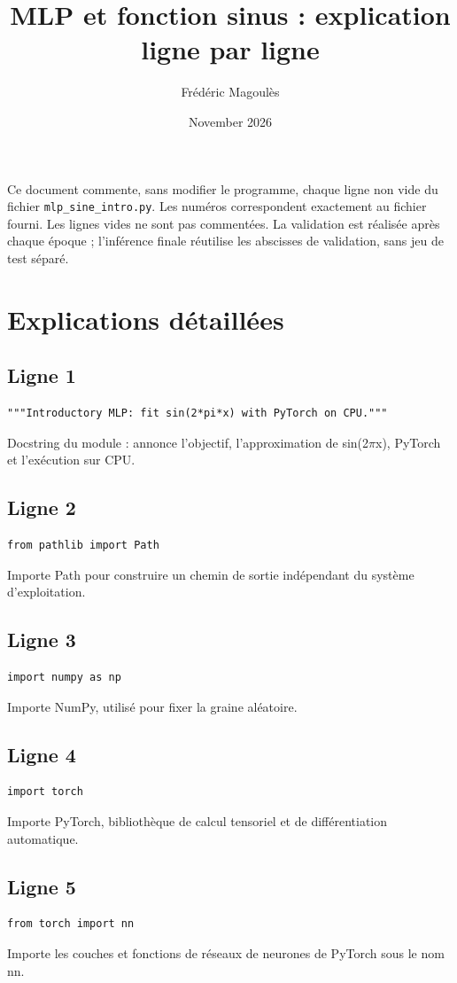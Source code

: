 \documentclass[11pt,a4paper]{article}
\title{MLP et fonction sinus : explication ligne par ligne}
\author{Frédéric Magoulès}
\date{November 2026}
\begin{document}
\maketitle
\noindent Ce document commente, sans modifier le programme, chaque ligne non vide du fichier \texttt{mlp\_sine\_intro.py}. Les numéros correspondent exactement au fichier fourni. Les lignes vides ne sont pas commentées. La validation est réalisée après chaque époque ; l'inférence finale réutilise les abscisses de validation, sans jeu de test séparé.
\section*{Explications détaillées}
\subsection*{Ligne 1}
\begin{lstlisting}
"""Introductory MLP: fit sin(2*pi*x) with PyTorch on CPU."""
\end{lstlisting}
Docstring du module : annonce l'objectif, l'approximation de sin(2$\pi$x), PyTorch et l'exécution sur CPU.

\subsection*{Ligne 2}
\begin{lstlisting}
from pathlib import Path
\end{lstlisting}
Importe Path pour construire un chemin de sortie indépendant du système d'exploitation.

\subsection*{Ligne 3}
\begin{lstlisting}
import numpy as np
\end{lstlisting}
Importe NumPy, utilisé pour fixer la graine aléatoire.

\subsection*{Ligne 4}
\begin{lstlisting}
import torch
\end{lstlisting}
Importe PyTorch, bibliothèque de calcul tensoriel et de différentiation automatique.

\subsection*{Ligne 5}
\begin{lstlisting}
from torch import nn
\end{lstlisting}
Importe les couches et fonctions de réseaux de neurones de PyTorch sous le nom nn.
\end{document}
